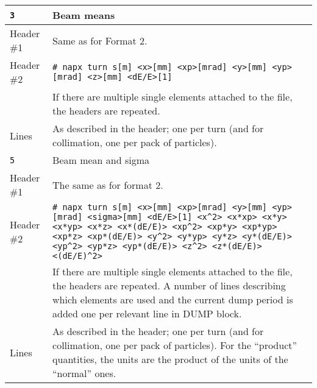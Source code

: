 \begin{center}
\begin{longtable}{|p{1.8cm}|p{13.8cm}|}
        \rowcolor{blue!15}
        \texttt{3} & Beam means \\
        \hline
        Header \#1 & Same as for Format 2. \\
        \hline
        Header \#2 & \texttt{\# napx turn s[m] <x>[mm] <xp>[mrad] <y>[mm] <yp>[mrad] <z>[mm] <dE/E>[1]}\vspace{1mm} \\
                   & If there are multiple single elements attached to the file, the headers are repeated.\\
        \hline
        Lines      & As described in the header; one per turn (and for collimation, one per pack of particles). \\
        \hline

        \rowcolor{blue!15}
        \texttt{5} & Beam mean and sigma \\
        \hline
        Header \#1 & The same as for format 2.\\
        \hline
	Header \#2 & \texttt{\# napx turn s[m] <x>[mm] <xp>[mrad] <y>[mm] <yp>[mrad] <sigma>[mm] <dE/E>[1] <x\^{}2> <x*xp> <x*y> <x*yp> <x*z> <x*(dE/E)> <xp\^{}2> <xp*y> <xp*yp> <xp*z> <xp*(dE/E)> <y\^{}2> <y*yp> <y*z> <y*(dE/E)> <yp\^{}2> <yp*z> <yp*(dE/E)> <z\^{}2> <z*(dE/E)> <(dE/E)\^{}2>}\vspace{1mm} \\
                   & If there are multiple single elements attached to the file, the headers are repeated. A number of lines describing which elements are used and the current dump period is added one per relevant line in DUMP block.\\
        \hline
        Lines      & As described in the header; one per turn (and for collimation, one per pack of particles). For the ``product'' quantities, the units are the product of the units of the ``normal'' ones. \\
        \hline


\end{longtable}
\end{center}
